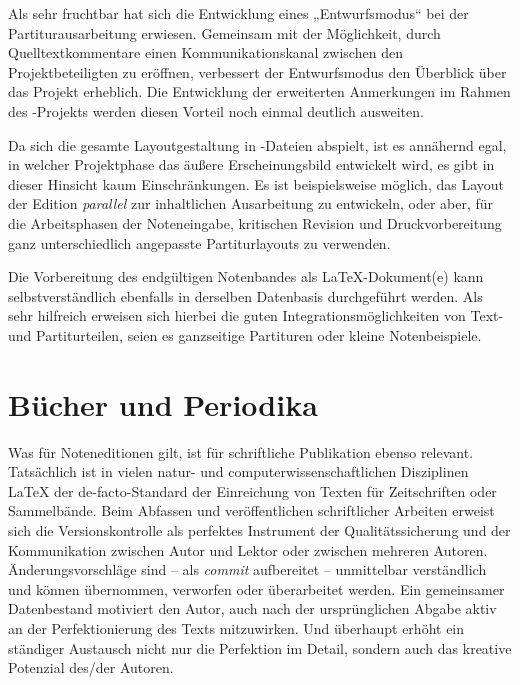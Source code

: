 \documentclass[DIV=12]{scrreprt}
\begin{document}
Als sehr fruchtbar hat sich die Entwicklung eines „Entwurfsmodus“ bei der Partiturausarbeitung erwiesen.
Gemeinsam mit der Möglichkeit, durch Quelltextkommentare einen Kommunikationskanal zwischen den Projektbeteiligten zu eröffnen, verbessert der Entwurfsmodus den Überblick über das Projekt erheblich.
Die Entwicklung der erweiterten Anmerkungen im Rahmen des -Projekts werden diesen Vorteil noch einmal deutlich ausweiten.

Da sich die gesamte Layoutgestaltung in -Dateien abspielt, ist es annähernd egal, in welcher Projektphase das äußere Erscheinungsbild entwickelt wird, es gibt in dieser Hinsicht kaum Einschränkungen.
Es ist beispielsweise möglich, das Layout der Edition \emph{parallel} zur inhaltlichen Ausarbeitung zu entwickeln, oder aber, für die Arbeitsphasen der Noteneingabe, kritischen Revision und Druckvorbereitung ganz unterschiedlich angepasste Partiturlayouts zu verwenden.

Die Vorbereitung des endgültigen Notenbandes als LaTeX-Dokument(e) kann selbstverständlich ebenfalls in derselben Datenbasis durchgeführt werden.
Als sehr hilfreich erweisen sich hierbei die guten Integrationsmöglichkeiten von Text- und Partiturteilen, seien es ganzseitige Partituren oder kleine Notenbeispiele.

\section{Bücher und Periodika}
\label{sec:pt_books-periodicals}
Was für Noteneditionen gilt, ist für schriftliche Publikation ebenso relevant.
Tatsächlich ist in vielen natur- und computerwissenschaftlichen Disziplinen \LaTeX{} der de-facto-Standard der Einreichung von Texten für Zeitschriften oder Sammelbände.
Beim Abfassen und veröffentlichen schriftlicher Arbeiten erweist sich die Versionskontrolle als perfektes Instrument der Qualitätssicherung und der Kommunikation zwischen Autor und Lektor oder zwischen mehreren Autoren.
Änderungsvorschläge sind -- als \emph{commit} aufbereitet -- unmittelbar verständlich und können übernommen, verworfen oder überarbeitet werden.
Ein gemeinsamer Datenbestand motiviert den Autor, auch nach der ursprünglichen Abgabe aktiv an der Perfektionierung des Texts mitzuwirken.
Und überhaupt erhöht ein ständiger Austausch nicht nur die Perfektion im Detail, sondern auch das kreative Potenzial des/der Autoren.
\end{document}
